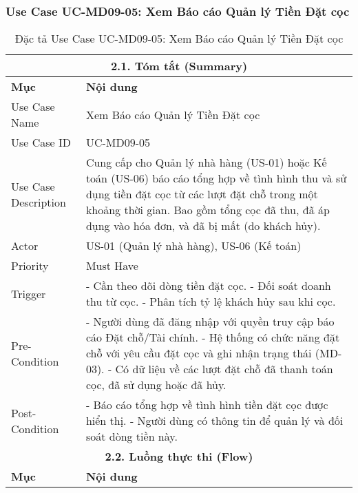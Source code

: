 \subsubsection{Use Case UC-MD09-05: Xem Báo cáo Quản lý Tiền Đặt cọc}
\begin{longtable}{|m{4cm}|p{11cm}|}
\caption{Đặc tả Use Case UC-MD09-05: Xem Báo cáo Quản lý Tiền Đặt cọc} \label{tab:uc_md09_05_corrected} \\
\hline
\multicolumn{2}{|c|}{\textbf{2.1. Tóm tắt (Summary)}} \\
\hline
\textbf{Mục} & \textbf{Nội dung} \\
\hline
\endhead %
\midrule
\endfoot %
\bottomrule
\endlastfoot %
Use Case Name & Xem Báo cáo Quản lý Tiền Đặt cọc \\
\hline
Use Case ID & UC-MD09-05 \\
\hline
Use Case Description & Cung cấp cho Quản lý nhà hàng (US-01) hoặc Kế toán (US-06) báo cáo tổng hợp về tình hình thu và sử dụng tiền đặt cọc từ các lượt đặt chỗ trong một khoảng thời gian. Bao gồm tổng cọc đã thu, đã áp dụng vào hóa đơn, và đã bị mất (do khách hủy). \\
\hline
Actor & US-01 (Quản lý nhà hàng), US-06 (Kế toán) \\
\hline
Priority & Must Have \\
\hline
Trigger & - Cần theo dõi dòng tiền đặt cọc. \newline - Đối soát doanh thu từ cọc. \newline - Phân tích tỷ lệ khách hủy sau khi cọc. \\
\hline
Pre-Condition & - Người dùng đã đăng nhập với quyền truy cập báo cáo Đặt chỗ/Tài chính. \newline - Hệ thống có chức năng đặt chỗ với yêu cầu đặt cọc và ghi nhận trạng thái (MD-03). \newline - Có dữ liệu về các lượt đặt chỗ đã thanh toán cọc, đã sử dụng hoặc đã hủy. \\
\hline
Post-Condition & - Báo cáo tổng hợp về tình hình tiền đặt cọc được hiển thị. \newline - Người dùng có thông tin để quản lý và đối soát dòng tiền này. \\
\hline
\multicolumn{2}{|c|}{\textbf{2.2. Luồng thực thi (Flow)}} \\
\hline
\textbf{Mục} & \textbf{Nội dung} \\
\hline

\end{longtable}
